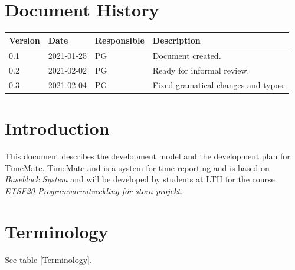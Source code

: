 \documentclass{article}
\date {#1}
\title {
    \documentNumber {00}    %
    \documentVersion {0.3}
    \documentTitle {Software Development Plan}
    \documentGroup {2}
    \documentResponsible {Project Management Group}
    \documentAuthors {Project Management Group}
    \documentDate {2021-02-04}
}
\begin{document}
\maketitle
\thispagestyle{empty}

\newpage

\tableofcontents

\newpage

\section{Document History}
\begin{tabular}{ l | l | l | l }
    Version & Date & Responsible & Description \\
    \hline
    0.1 & 2021-01-25 & PG & Document created. \\
    0.2 & 2021-02-02 & PG & Ready for informal review. \\
    0.3 & 2021-02-04 & PG & Fixed gramatical changes and typos. \\
\end{tabular}

\section{Introduction}
    This document describes the development model and the development plan for TimeMate.
    TimeMate and is a system for time reporting and is based on \textit{Baseblock System} and will be developed by students at LTH for the course 
    \textit{ETSF20 Programvaruutveckling för stora projekt}.

\section{Terminology}
    
    See table \ref{Terminology}.
    
\end{document}
